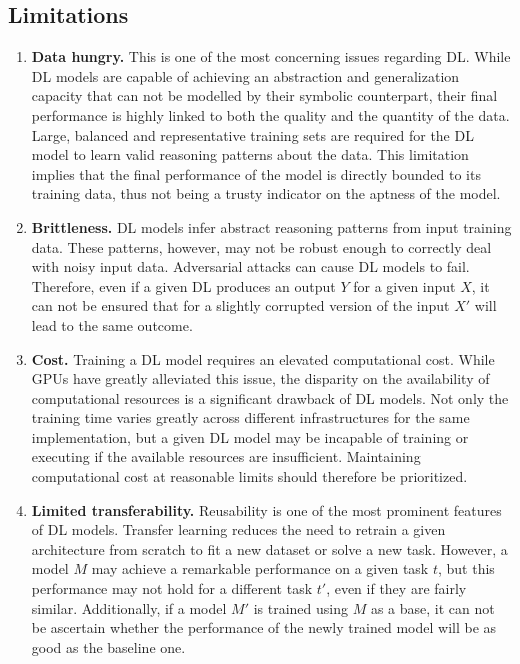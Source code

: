 \subsection{Limitations}
\begin{enumerate} [start=1,label={\bfseries L\arabic*.}]
    \item \label{kbsintrodl_L_data_hungry} \textbf{Data hungry.} This is one of the most concerning issues regarding DL. While DL models are capable of achieving an abstraction and generalization capacity that can not be modelled by their symbolic counterpart, their final performance is highly linked to both the quality and the quantity of the data. Large, balanced and representative training sets are required for the DL model to learn valid reasoning patterns about the data. This limitation implies that the final performance of the model is directly bounded to its training data, thus not being a trusty indicator on the aptness of the model. 
    
    \item \label{kbsintrodl_L_brittleness} \textbf{Brittleness.} DL models infer abstract reasoning patterns from input training data. These patterns, however, may not be robust enough to correctly deal with noisy input data. Adversarial attacks can cause DL models to fail. Therefore, even if a given DL produces an output $Y$ for a given input $X$, it can not be ensured that for a slightly corrupted version of the input $X'$ will lead to the same outcome.
    
    \item \label{kbsintrodl_L_cost} \textbf{Cost.} Training a DL model requires an elevated computational cost. While GPUs have greatly alleviated this issue, the disparity on the availability of computational resources is a significant drawback of DL models. Not only the training time varies greatly across different infrastructures for the same implementation, but a given DL model may be incapable of training or executing if the available resources are insufficient. Maintaining computational cost at reasonable limits should therefore be prioritized.  
    
    \item \label{kbsintrodl_L_transfer} \textbf{Limited transferability.} Reusability is one of the most prominent features of DL models. Transfer learning reduces the need to retrain a given architecture from scratch to fit a new dataset or solve a new task. However, a model $M$ may achieve a remarkable performance on a given task $t$, but this performance may not  hold for a different task $t'$, even if they are fairly similar. Additionally, if a model $M'$ is trained using $M$ as a base, it can not be ascertain whether the performance of the newly trained model will be as good as the baseline one.
    

\end{enumerate}
